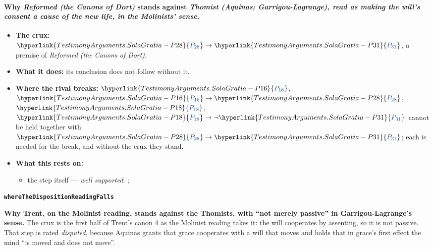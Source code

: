 \documentclass[11pt]{article}
\newcommand{\pvar}[2]{\hyperlink{#1-P#2}{\textcolor{claimlink}{P_{#2}}}}
\begin{document}
\paragraph{Why \emph{Reformed (the Canons of Dort)} stands against \emph{Thomist (Aquinas; Garrigou-Lagrange), read as making the will’s consent a cause of the new life, in the Molinists’ sense}.}
\begin{itemize}
\item \textbf{The crux:} \(\pvar{TestimonyArguments.SolaGratia}{28} \rightarrow \pvar{TestimonyArguments.SolaGratia}{31}\), a premise of \emph{Reformed (the Canons of Dort)}.
\item \textbf{What it does:} its conclusion does not follow without it.
\item \textbf{Where the rival breaks:} \(\pvar{TestimonyArguments.SolaGratia}{16}\), \(\pvar{TestimonyArguments.SolaGratia}{16} \rightarrow \pvar{TestimonyArguments.SolaGratia}{28}\), \(\pvar{TestimonyArguments.SolaGratia}{18}\), \(\pvar{TestimonyArguments.SolaGratia}{18} \rightarrow \lnot \pvar{TestimonyArguments.SolaGratia}{31}\) cannot be held together with \(\pvar{TestimonyArguments.SolaGratia}{28} \rightarrow \pvar{TestimonyArguments.SolaGratia}{31}\); each is needed for the break, and without the crux they stand.
\item \textbf{What this rests on:}
\begin{itemize}
\item the step itself --- \emph{well supported}: \cite[Solid Declaration II.89]{concordia-triglotta-1921}; \cite[Canons of Dort, III/IV, art. 12]{schaff-creeds-christendom-3-1977}
\end{itemize}
\end{itemize}
\par\medskip\noindent\textbf{\texttt{where\allowbreak{}The\allowbreak{}Disposition\allowbreak{}Reading\allowbreak{}Falls}}\par\nobreak\noindent
\textbf{Why Trent, on the Molinist reading, stands against the Thomists, with “not merely passive” in Garrigou-Lagrange’s sense.} The crux is the first half of Trent’s canon 4 as the Molinist reading takes it: the will cooperates by assenting, so it is not passive. That step is rated \emph{disputed}, because Aquinas grants that grace cooperates with a will that moves and holds that in grace’s first effect the mind “is moved and does not move”.
\end{document}
